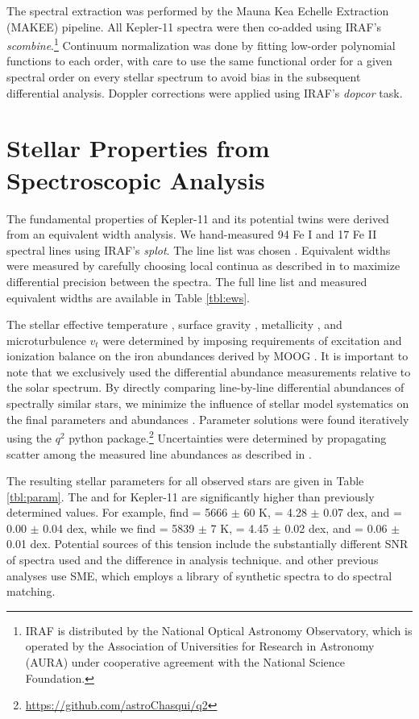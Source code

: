 \documentclass[oneside]{emulateapj}
\begin{document}
The spectral extraction was performed by the Mauna Kea Echelle Extraction (MAKEE) pipeline. All Kepler-11 spectra were then co-added using IRAF's \textit{scombine}.\footnote{IRAF is distributed by the National Optical Astronomy Observatory, which is operated by the Association of Universities for Research in Astronomy (AURA) under cooperative agreement with the National Science Foundation.} Continuum normalization was done by fitting low-order polynomial functions to each order, with care to use the same functional order for a given spectral order on every stellar spectrum to avoid bias in the subsequent differential analysis. Doppler corrections were applied using IRAF's \textit{dopcor} task.


\section{Stellar Properties from Spectroscopic Analysis}

The fundamental properties of Kepler-11 and its potential twins were derived from an equivalent width analysis. We hand-measured 94 Fe I and 17 Fe II spectral lines using IRAF's \textit{splot}. The line list was chosen . Equivalent widths were measured by carefully choosing local continua as described in \citet{Bedell2014} to maximize differential precision between the spectra. The full line list and measured equivalent widths are available in Table \ref{tbl:ews}.

The stellar effective temperature \teff, surface gravity \logg, metallicity \feh, and microturbulence $v_t$ were determined by imposing requirements of excitation and ionization balance on the iron abundances derived by MOOG \citep{Sneden1973}. It is important to note that we exclusively used the differential abundance measurements relative to the solar spectrum. By directly comparing line-by-line differential abundances of spectrally similar stars, we minimize the influence of stellar model systematics on the final parameters and abundances \citep[see e.g.][]{Ramirez2014}. Parameter solutions were found iteratively using the $q^2$ python package.\footnote{\url{https://github.com/astroChasqui/q2}} Uncertainties were determined by propagating scatter among the measured line abundances as described in \citet{Epstein2010, Bensby2014}.

The resulting stellar parameters for all observed stars are given in Table \ref{tbl:param}. The \teff and \logg for Kepler-11 are significantly higher than previously determined values. For example, \citet{Lissauer2013} find \teff = 5666 $\pm$ 60 K, \logg = 4.28 $\pm$ 0.07 dex, and \feh = 0.00 $\pm$ 0.04 dex, while we find \teff = 5839 $\pm$ 7 K, \logg = 4.45 $\pm$ 0.02 dex, and \feh = 0.06 $\pm$ 0.01 dex. Potential sources of this tension include the substantially different SNR of spectra used and the difference in analysis technique. \citet{Lissauer2013} and other previous analyses use SME, which employs a library of synthetic spectra to do spectral matching. 
\end{document}
